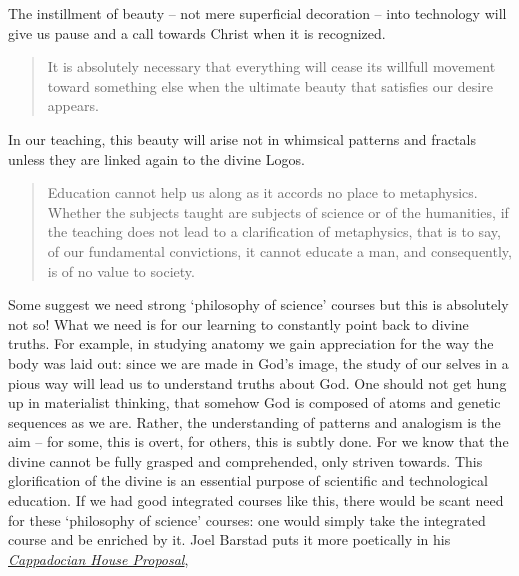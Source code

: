 \documentclass[letterpaper]{article}
\begin{document}
    The instillment of beauty -- not mere superficial decoration -- into technology will give us pause and a call towards Christ when it is recognized.

    \begin{quote}
      It is absolutely necessary that everything will cease its willfull movement toward something else when the ultimate beauty that satisfies our desire appears.
    \end{quote}

    In our teaching, this beauty will arise not in whimsical patterns and fractals unless they are linked again to the divine Logos.



    \begin{quote}
      Education cannot help us along as it accords no place to metaphysics. Whether the subjects taught are subjects of science or of the humanities, if the teaching does not lead to a clarification of metaphysics, that is to say, of our fundamental convictions, it cannot educate a man, and consequently, is of no value to society.
    \end{quote}

    Some suggest we need strong `philosophy of science' courses but this is absolutely not so! What we need is for our learning to constantly point back to divine truths. For example, in studying anatomy we gain appreciation for the way the body was laid out: since we are made in God's image, the study of our selves in a pious way will lead us to understand truths about God. One should not get hung up in materialist thinking, that somehow God is composed of atoms and genetic sequences as we are. Rather, the understanding of patterns and analogism is the aim -- for some, this is overt, for others, this is subtly done. For we know that the divine cannot be fully grasped and comprehended, only striven towards. This glorification of the divine is an essential purpose of scientific and technological education. If we had good integrated courses like this, there would be scant need for these `philosophy of science' courses: one would simply take the integrated course and be enriched by it. Joel Barstad puts it more poetically in his \href{https://byzantinela.com/cappadocian-house-proposal/}{\textit{Cappadocian House Proposal}},
\end{document}
